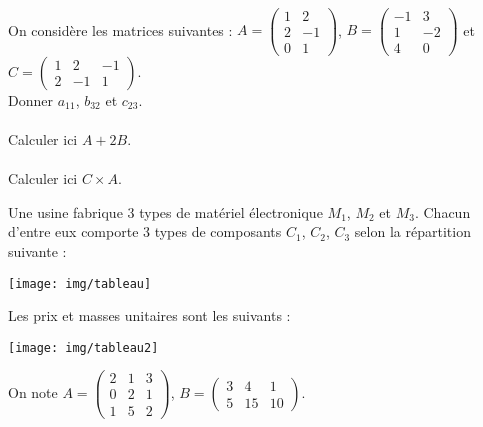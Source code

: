 \documentclass[a4paper,10pt]{article}
\begin{document}


\\

On considère les matrices suivantes : 
$A = \begin{pmatrix}
1&2\\
2 & -1\\
0 & 1
\end{pmatrix}$,
$B = \begin{pmatrix}
-1&3\\
1 & -2\\
4 & 0
\end{pmatrix}$ et 
$C = \begin{pmatrix}
1&2 & -1\\
2 & -1 & 1
\end{pmatrix}$.\\

Donner $a_{11}$, $b_{32}$ et $c_{23}$.\\

\\

Calculer ici $A + 2B$.\\

\\

Calculer ici $C\times A$.\\


\newpage



Une usine fabrique 3 types de matériel électronique $M_1$, $M_2$ et $M_3$. Chacun d'entre eux comporte 3 types de composants $C_1$, $C_2$, $C_3$ selon la répartition suivante :

\begin{center}
\texttt{[image: img/tableau]}
\end{center}

Les prix et masses unitaires sont les suivants :

\begin{center}
\texttt{[image: img/tableau2]}
\end{center}

On note 
$A = \begin{pmatrix}
2&1&3\\
0 &2& 1\\
1 & 5 & 2
\end{pmatrix}$,
$B = \begin{pmatrix}
3&4&1\\
5&15&10
\end{pmatrix}$.\\
\end{document}
